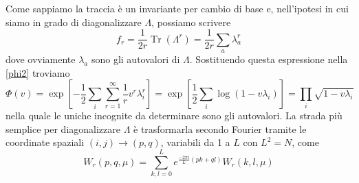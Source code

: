 \documentclass[11pt]{article}
\DeclareMathOperator{\Tr}{Tr}
\DeclareMathOperator{\Exp}{exp}
\DeclareMathOperator{\Log}{log}
\begin{document}
Come sappiamo la traccia è un invariante per cambio di base e, nell'ipotesi in cui siamo in grado di diagonalizzare $\Lambda$, possiamo scrivere
\begin{equation}\label{autovalori}
 f_r=\frac{1}{2r}\Tr{(\Lambda^r)}=\frac{1}{2r}\sum_a \lambda_a^r
\end{equation}
dove ovviamente $\lambda_a$ sono gli autovalori di $\Lambda$. Sostituendo questa espressione nella \ref{phi2} troviamo
\begin{equation}
\Phi(v)= \Exp \left [ -\frac{1}{2}\sum_i\sum_{r=1}^\infty\frac{1}{r}v^r\lambda_i^r \right ] = \Exp \left [ \frac{1}{2} \sum_i \Log (1-v\lambda_i) \right]= \prod_i \sqrt{1-v\lambda_i}
\end{equation}
nella quale le uniche incognite da determinare sono gli autovalori.
La strada più semplice per diagonalizzare $\Lambda$ è trasformarla secondo Fourier tramite le coordinate spaziali $(i,j) \to (p,q)$, variabili da 1 a $L$ con $L^2=N$, come
\begin{equation}\label{trasformata}
W_r(p,q,\mu)=\sum_{k,l=0}^L e^{\frac{-2\pi i}{L}(pk+ql)}W_r(k,l,\mu)
\end{equation} 
\end{document}
